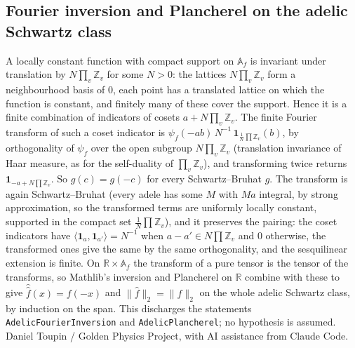 \documentclass{report}
\theoremstyle{definition}
\begin{document}
\begin{itemize}
\begin{itemize}
\section{Fourier inversion and Plancherel on the adelic Schwartz class}
A locally constant function with compact support on $\mathbb A_f$ is invariant under translation by $N\prod_v\mathbb Z_v$ for some $N>0$: the lattices $N\prod_v\mathbb Z_v$ form a neighbourhood basis of $0$, each point has a translated lattice on which the function is constant, and finitely many of these cover the support. Hence it is a finite combination of indicators of cosets $a+N\prod_v\mathbb Z_v$. The finite Fourier transform of such a coset indicator is $\psi_f(-ab)\,N^{-1}\,\mathbf 1_{\frac1N\prod\mathbb Z_v}(b)$, by orthogonality of $\psi_f$ over the open subgroup $N\prod_v\mathbb Z_v$ (translation invariance of Haar measure, as for the self-duality of $\prod_v\mathbb Z_v$), and transforming twice returns $\mathbf 1_{-a+N\prod\mathbb Z_v}$. So $\hat{\hat g}(c)=g(-c)$ for every Schwartz--Bruhat $g$. The transform is again Schwartz--Bruhat (every adele has some $M$ with $Ma$ integral, by strong approximation, so the transformed terms are uniformly locally constant, supported in the compact set $\frac1N\prod\mathbb Z_v$), and it preserves the pairing: the coset indicators have $\langle\mathbf 1_a,\mathbf 1_{a'}\rangle=N^{-1}$ when $a-a'\in N\prod\mathbb Z_v$ and $0$ otherwise, the transformed ones give the same by the same orthogonality, and the sesquilinear extension is finite. On $\mathbb R\times\mathbb A_f$ the transform of a pure tensor is the tensor of the transforms, so Mathlib's inversion and Plancherel on $\mathbb R$ combine with these to give $\hat{\hat f}(x)=f(-x)$ and $\|\hat f\|_2=\|f\|_2$ on the whole adelic Schwartz class, by induction on the span. This discharges the statements \texttt{AdelicFourierInversion} and \texttt{AdelicPlancherel}; no hypothesis is assumed.
Daniel Toupin / Golden Physics Project, with AI assistance from Claude Code.



\end{itemize}
\end{itemize}
\end{document}
